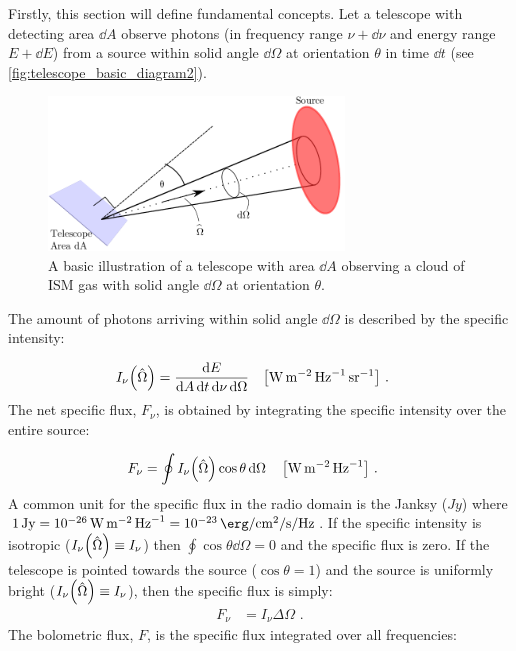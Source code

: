 Firstly, this section will define fundamental concepts.
\newpar 
\noindent Let a telescope with detecting area $\dd{A}$ observe photons (in frequency range $\nu + \dd{\nu}$ and energy range $E+\dd{E}$) from a source within solid angle $\dd{\Omega}$ at orientation $\theta$ in time $\dd{t}$ (see \autoref{fig:telescope_basic_diagram2}).
\begin{figure}
	\centering
	\includegraphics[width=0.7\textwidth]{06_Interstellar_Medium/Images/Theory/intensity.pdf}
	\caption{A basic illustration of a telescope with area $\dd{A}$ observing a cloud of ISM gas with solid angle $\dd{\Omega}$ at orientation $\theta$.}
	\label{fig:telescope_basic_diagram2}
\end{figure}
The amount of photons arriving within solid angle $\dd{\Omega}$ is described by the specific intensity:

\begin{equation}
	\begin{aligned}
		I_\nu\qty(\hat{\Omega})&=\frac{\dd{E}}{\dd{A}\dd{t}\dd{\nu}\dd{\Omega}}\quad\qty[\si{\watt\per\meter\squared\per\hertz\per\steradian}]\text{ .}
	\end{aligned}
\end{equation}
\newpar 
\noindent The net specific flux, $F_\nu$, is obtained by integrating the specific intensity over the entire source:

\begin{equation}
	\begin{aligned}
		F_\nu &=\oint I_\nu\qty(\hat{\Omega})\cos\theta\dd{\Omega}\quad\qty[\si{\watt\per\meter\squared\per\hertz}]\text{ .}
	\end{aligned}
\end{equation}
\noindent A common unit for the specific flux in the radio domain is the Janksy ($\si{Jy}$) where $1\,\si{Jy}=10^{-26}\,\si{\watt\per\meter\squared\per\hertz} = 10^{-23}\,\si{\erg\per\centi\meter\squared\per\second\per\hertz}$. If the specific intensity is isotropic ($I_\nu\qty(\hat{\Omega})\equiv I_\nu$) then $\oint \cos\theta\dd{\Omega}=0$ and the specific flux is zero. If the telescope is pointed towards the source ($\cos\theta=1$) and the source is uniformly bright ($I_\nu\qty(\hat{\Omega})\equiv I_\nu$), then the specific flux is simply:
\begin{equation}
	\begin{aligned}
		F_\nu&=I_\nu\Delta\Omega\text{ .}
	\end{aligned}\label{eq:specifc_flux_uniform_source}
\end{equation}
\noindent The bolometric flux, $F$, is the specific flux integrated over all frequencies:

